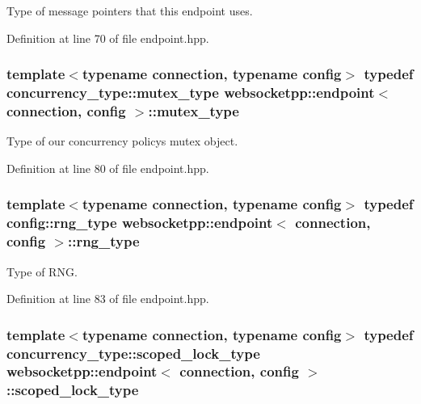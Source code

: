 Type of message pointers that this endpoint uses. 



Definition at line 70 of file endpoint.\+hpp.

\hypertarget{classwebsocketpp_1_1endpoint_ab4aa523f6e1fddb2e77cdf7b36771992}{}
\subsubsection[{mutex\+\_\+type}]{\setlength{\rightskip}{0pt plus 5cm}template$<$typename connection, typename config$>$ typedef concurrency\+\_\+type\+::mutex\+\_\+type {\bf websocketpp\+::endpoint}$<$ {\bf connection}, config $>$\+::{\bf mutex\+\_\+type}}\label{classwebsocketpp_1_1endpoint_ab4aa523f6e1fddb2e77cdf7b36771992}


Type of our concurrency policy\textquotesingle{}s mutex object. 



Definition at line 80 of file endpoint.\+hpp.

\hypertarget{classwebsocketpp_1_1endpoint_adbb0a9eea3ebbf5139966858bd0fa16d}{}
\subsubsection[{rng\+\_\+type}]{\setlength{\rightskip}{0pt plus 5cm}template$<$typename connection, typename config$>$ typedef config\+::rng\+\_\+type {\bf websocketpp\+::endpoint}$<$ {\bf connection}, config $>$\+::{\bf rng\+\_\+type}}\label{classwebsocketpp_1_1endpoint_adbb0a9eea3ebbf5139966858bd0fa16d}


Type of R\+N\+G. 



Definition at line 83 of file endpoint.\+hpp.

\hypertarget{classwebsocketpp_1_1endpoint_ae16d71c671d97d4b29c5fd5806d45815}{}
\subsubsection[{scoped\+\_\+lock\+\_\+type}]{\setlength{\rightskip}{0pt plus 5cm}template$<$typename connection, typename config$>$ typedef concurrency\+\_\+type\+::scoped\+\_\+lock\+\_\+type {\bf websocketpp\+::endpoint}$<$ {\bf connection}, config $>$\+::{\bf scoped\+\_\+lock\+\_\+type}}\label{classwebsocketpp_1_1endpoint_ae16d71c671d97d4b29c5fd5806d45815}


